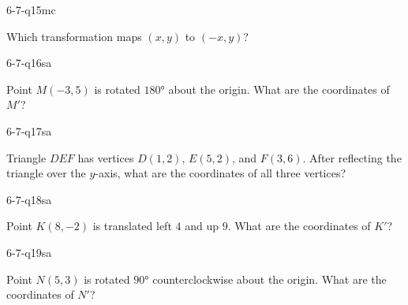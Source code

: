 \begin{practiceQuestion}{6-7-q15}{mc}
\begin{questionText}
Which transformation maps $(x, y)$ to $(-x, y)$?
\end{questionText}
\end{practiceQuestion}


\begin{practiceQuestion}{6-7-q16}{sa}
\begin{questionText}
Point $M(-3, 5)$ is rotated $180°$ about the origin. What are the coordinates of $M'$?
\end{questionText}
\end{practiceQuestion}

\begin{practiceQuestion}{6-7-q17}{sa}
\begin{questionText}
Triangle $DEF$ has vertices $D(1, 2)$, $E(5, 2)$, and $F(3, 6)$. After reflecting the triangle over the $y$-axis, what are the coordinates of all three vertices?
\end{questionText}
\end{practiceQuestion}

\begin{practiceQuestion}{6-7-q18}{sa}
\begin{questionText}
Point $K(8, -2)$ is translated left $4$ and up $9$. What are the coordinates of $K'$?
\end{questionText}
\end{practiceQuestion}

\begin{practiceQuestion}{6-7-q19}{sa}
\begin{questionText}
Point $N(5, 3)$ is rotated $90°$ counterclockwise about the origin. What are the coordinates of $N'$?
\end{questionText}
\end{practiceQuestion}

